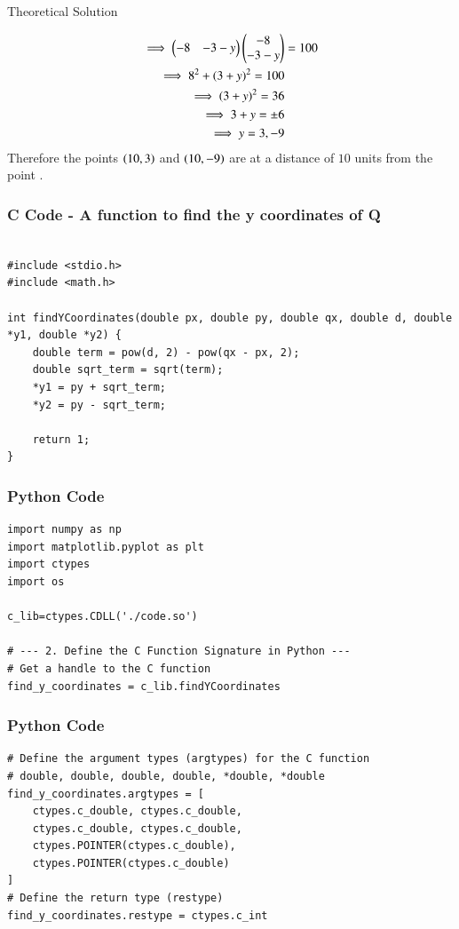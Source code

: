 \documentclass{beamer}
\begin{document}
\begin{frame}{Theoretical Solution}

\begin{align}
         \implies\begin{pmatrix}-8 & -3-y\end{pmatrix}\begin{pmatrix}-8\\-3-y\end{pmatrix} &= 100\\
        \implies 8^2 + (3+y)^2 = 100\\
        \implies (3+y)^2=36\\
        \implies 3+y=\pm6\\
        \implies y=3, -9
\end{align}
\bigskip
Therefore the points $\left(10,3\right)$ and $\left(10,-9\right)$ are at a distance of $10$ units from the point .
\end{frame}


\begin{frame}[fragile]
    \frametitle{C Code - A function to find the y coordinates of Q}

    \begin{lstlisting}

#include <stdio.h>
#include <math.h>

int findYCoordinates(double px, double py, double qx, double d, double *y1, double *y2) {
    double term = pow(d, 2) - pow(qx - px, 2);
    double sqrt_term = sqrt(term);
    *y1 = py + sqrt_term;
    *y2 = py - sqrt_term;
    
    return 1; 
}
    \end{lstlisting}
\end{frame}

\begin{frame}[fragile]
    \frametitle{Python Code}
    \begin{lstlisting}
import numpy as np
import matplotlib.pyplot as plt
import ctypes
import os

c_lib=ctypes.CDLL('./code.so')

# --- 2. Define the C Function Signature in Python ---
# Get a handle to the C function
find_y_coordinates = c_lib.findYCoordinates

    \end{lstlisting}
\end{frame}

\begin{frame}[fragile]
    \frametitle{Python Code}
    \begin{lstlisting}
# Define the argument types (argtypes) for the C function
# double, double, double, double, *double, *double
find_y_coordinates.argtypes = [
    ctypes.c_double, ctypes.c_double,
    ctypes.c_double, ctypes.c_double,
    ctypes.POINTER(ctypes.c_double),
    ctypes.POINTER(ctypes.c_double)
]
# Define the return type (restype)
find_y_coordinates.restype = ctypes.c_int

    \end{lstlisting}
\end{frame}
\end{document}
